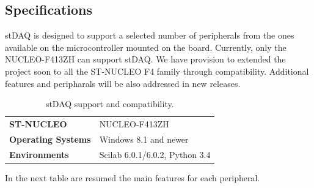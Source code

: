 \documentclass[letterpaper,10pt,english]{hitec}
\begin{document}


\newpage


\subsection{Specifications}

stDAQ is designed to support a selected number of peripherals from the ones available on the microcontroller mounted on the board. Currently, only the NUCLEO-F413ZH can support stDAQ. We have provision to extended the project soon to all the ST-NUCLEO F4 family through compatibility. Additional features and peripharals will be also addressed in new releases.

\begin{table}[h!]
\caption{stDAQ support and compatibility.}
\centering
\begin{tabular}{|ll|}
\textbf{ST-NUCLEO} & NUCLEO-F413ZH  \\
\textbf{Operating Systems} & Windows 8.1 and newer \\ 
\textbf{Environments} & Scilab 6.0.1/6.0.2, Python 3.4 
\end{tabular}
\end{table}

In the next table are resumed the main features for each peripheral.
\end{document}
